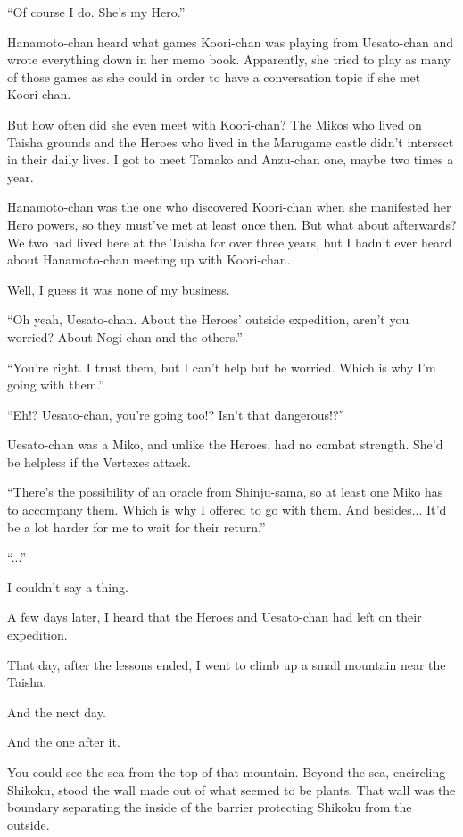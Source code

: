 ``Of course I do. She's my Hero.''

Hanamoto-chan heard what games Koori-chan was playing from Uesato-chan and wrote everything down in her memo book. Apparently, she tried to play as many of those games as she could in order to have a conversation topic if she met Koori-chan.

But how often did she even meet with Koori-chan? The Mikos who lived on Taisha grounds and the Heroes who lived in the Marugame castle didn't intersect in their daily lives. I got to meet Tamako and Anzu-chan one, maybe two times a year.

Hanamoto-chan was the one who discovered Koori-chan when she manifested her Hero powers, so they must've met at least once then. But what about afterwards? We two had lived here at the Taisha for over three years, but I hadn't ever heard about Hanamoto-chan meeting up with Koori-chan.

Well, I guess it was none of my business.

``Oh yeah, Uesato-chan. About the Heroes' outside expedition, aren't you worried? About Nogi-chan and the others.''

``You're right. I trust them, but I can't help but be worried. Which is why I'm going with them.''

``Eh!? Uesato-chan, you're going too!? Isn't that dangerous!?''

Uesato-chan was a Miko, and unlike the Heroes, had no combat strength. She'd be helpless if the Vertexes attack.

``There's the possibility of an oracle from Shinju-sama, so at least one Miko has to accompany them. Which is why I offered to go with them. And besides... It'd be a lot harder for me to wait for their return.''

``...''

I couldn't say a thing.

A few days later, I heard that the Heroes and Uesato-chan had left on their expedition.

That day, after the lessons ended, I went to climb up a small mountain near the Taisha.

And the next day.

And the one after it.

You could see the sea from the top of that mountain. Beyond the sea, encircling Shikoku, stood the wall made out of what seemed to be plants. That wall was the boundary separating the inside of the barrier protecting Shikoku from the outside.

